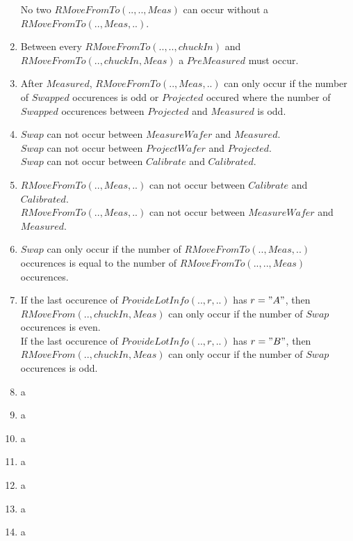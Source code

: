 \begin{enumerate}
	No two $RMoveFromTo(..,..,Meas)$ can occur without a $RMoveFromTo(..,Meas,..)$.
	\item Between every $RMoveFromTo(..,..,chuckIn)$ and $RMoveFromTo(..,chuckIn,Meas)$ a $PreMeasured$ must occur.
	\item After $Measured$, $RMoveFromTo(..,Meas,..)$ can only occur if the number of $Swapped$ occurences is odd or $Projected$ occured where the number of $Swapped$ occurences between $Projected$ and $Measured$ is odd.
	\item $Swap$ can not occur between $MeasureWafer$ and $Measured$.\\$Swap$ can not occur between $ProjectWafer$ and $Projected$. \\$Swap$ can not occur between $Calibrate$ and $Calibrated$.
	\item $RMoveFromTo(.., Meas, ..)$ can not occur between $Calibrate$ and $Calibrated$.\\ $RMoveFromTo(.., Meas, ..)$ can not occur between $MeasureWafer$ and $Measured$.\\
	\item $Swap$ can only occur if the number of $RMoveFromTo(.., Meas,..)$ occurences is equal to the number of $RMoveFromTo(..,..,Meas)$ occurences.
	\item If the last occurence of $ProvideLotInfo(..,r,..)$ has $r="A"$, then $RMoveFrom(..,chuckIn,Meas)$ can only occur if the number of $Swap$ occurences is even.\\
	If the last occurence of $ProvideLotInfo(..,r,..)$ has $r="B"$, then $RMoveFrom(..,chuckIn,Meas)$ can only occur if the number of $Swap$ occurences is odd.\\
	\item a
	\item a
	\item a
	\item a
	\item a
	\item a
	\item a
\end{enumerate}